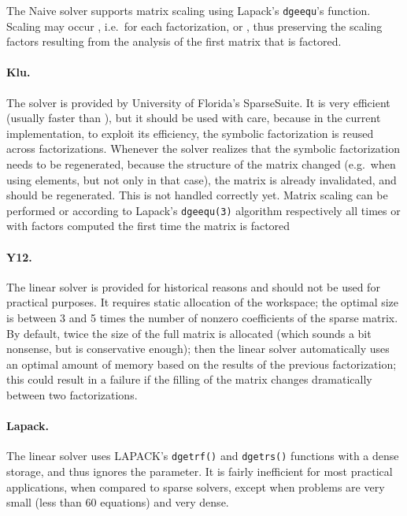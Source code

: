 \bigskip

\noindent
The Naive solver supports matrix scaling using Lapack's \texttt{dgeequ}'s
function.
Scaling may occur , i.e.\ for each factorization,
or , thus preserving the scaling factors resulting
from the analysis of the first matrix that is factored.

\paragraph{Klu.}
The  solver is provided by University of Florida's SparseSuite.
It is very efficient (usually faster than ),
but it should be used with care, because in the current implementation,
to exploit its efficiency, the symbolic factorization is reused across
factorizations.
Whenever the solver realizes that the symbolic factorization
needs to be regenerated, because the structure of the matrix changed
(e.g.\ when using  elements, but not only in that case),
the matrix is already invalidated, and should be regenerated.
This is not handled correctly yet.
Matrix scaling can be performed  or  
according to Lapack's \texttt{dgeequ(3)} algorithm
respectively all times or with factors computed the first time
the matrix is factored

\paragraph{Y12.}
The  linear solver is provided for historical reasons
and should not be used for practical purposes.
It requires static allocation of the workspace;
the optimal size  is between 3 and 5 times
the number of nonzero coefficients of the sparse matrix.
By default, twice the size of the full matrix is allocated
(which sounds a bit nonsense, but is conservative enough);
then the linear solver automatically uses an optimal amount of memory
based on the results of the previous factorization; this could
result in a failure if the filling of the matrix changes 
dramatically between two factorizations.

\paragraph{Lapack.}
The  linear solver uses LAPACK's \texttt{dgetrf()}
and \texttt{dgetrs()} functions with a dense storage,
and thus ignores the  parameter.
It is fairly inefficient for most practical applications,
when compared to sparse solvers, except when problems are very small
(less than 60 equations) and very dense.

